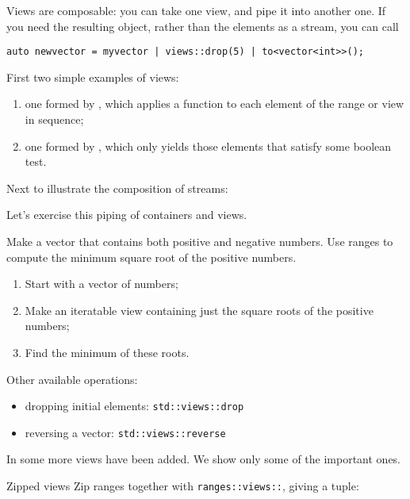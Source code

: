 Views are composable: you can take one view, and pipe it into another one.
If you need the resulting object, rather than the elements as a stream,
you can call
\begin{lstlisting}
auto newvector = myvector | views::drop(5) | to<vector<int>>();
\end{lstlisting}

First two simple examples of views:
\begin{enumerate}
\item
  one formed by , which applies
  a function to each element of the range or view in sequence;
\item one formed by , which only
  yields those elements that satisfy some boolean test.
\end{enumerate}


Next to illustrate the composition of streams:


Let's exercise this piping of containers and views.

\begin{exercise}
  Make a vector that contains both positive and negative numbers.
  Use ranges to compute the minimum square root of the positive numbers.
  \begin{enumerate}
  \item Start with a vector of numbers;
  \item Make an iteratable view containing just the square roots of the positive numbers;
  \item Find the minimum of these roots.
  \end{enumerate}
\end{exercise}

Other available operations:
\begin{itemize}
\item dropping initial elements: \lstinline+std::views::drop+
\item reversing a vector: \lstinline+std::views::reverse+
\end{itemize}

In  some more views have been added.
We show only some of the important ones.

\begin{block}{Zipped views}
  \label{sl:range-zip}
  Zip ranges together with \lstinline{ranges::views::},
  giving a tuple:
\end{block}


